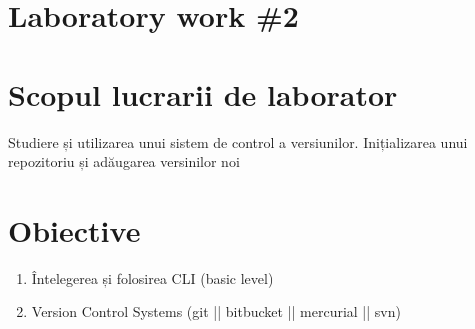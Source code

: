 \section*{Laboratory work \#2}

\section{Scopul lucrarii de laborator}
Studiere și utilizarea unui sistem de control a versiunilor. Inițializarea unui repozitoriu și adăugarea versinilor noi
\section{Obiective}

\begin{enumerate}
\item Întelegerea și folosirea CLI (basic level)
\item Version Control Systems (git || bitbucket || mercurial || svn)
\end{enumerate}

\clearpage